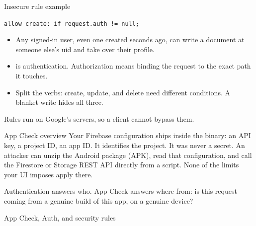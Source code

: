\documentclass[10pt,aspectratio=169,t]{beamer}
\begin{document}
\begin{frame}[eyebrow=Authorization]{Insecure rule example}
  \vskip 1mm
  \begin{warning}
    \texttt{allow create: if request.auth != null;}
  \end{warning}
  \begin{itemize}
    \item Any signed-in user, even one created seconds ago, can write a document at someone else's uid and take over their profile.
    \item {} is authentication. Authorization means binding the request to the exact path it touches.
    \item Split the verbs: create, update, and delete need different conditions. A blanket write hides all three.
  \end{itemize}
  \begin{takeaway}{Rules run on Google's servers, so a client cannot bypass them.}\end{takeaway}
\end{frame}

\begin{frame}[eyebrow=App Check]{App Check overview}
  \vskip 3mm
  Your Firebase configuration ships inside the binary: an API key, a project ID, an app ID. It identifies the project. It was never a secret.
  \vskip 3mm
  An attacker can unzip the Android package (APK), read that configuration, and call the Firestore or Storage REST API directly from a script. None of the limits your UI imposes apply there.
  \begin{takeaway}{Authentication answers who.}
    App Check answers where from: is this request coming from a genuine build of this app, on a genuine device?
  \end{takeaway}
\end{frame}

\begin{frame}[eyebrow=App Check]{App Check, Auth, and security rules}
  \vskip 3mm
  \begin{grid}[3]
  \end{grid}
\end{frame}
\end{document}
